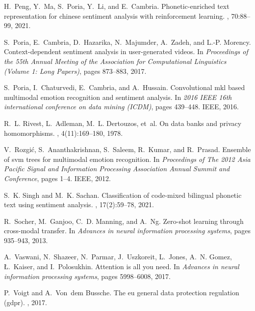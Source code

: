 \documentclass[11pt]{article}
\begin{document}
\begin{thebibliography}{10}
H.~Peng, Y.~Ma, S.~Poria, Y.~Li, and E.~Cambria.
\newblock Phonetic-enriched text representation for chinese sentiment analysis
  with reinforcement learning.
, 70:88--99, 2021.

S.~Poria, E.~Cambria, D.~Hazarika, N.~Majumder, A.~Zadeh, and L.-P. Morency.
\newblock Context-dependent sentiment analysis in user-generated videos.
\newblock In {\em Proceedings of the 55th Annual Meeting of the Association for
  Computational Linguistics (Volume 1: Long Papers)}, pages 873--883, 2017.

S.~Poria, I.~Chaturvedi, E.~Cambria, and A.~Hussain.
\newblock Convolutional mkl based multimodal emotion recognition and sentiment
  analysis.
\newblock In {\em 2016 IEEE 16th international conference on data mining
  (ICDM)}, pages 439--448. IEEE, 2016.

R.~L. Rivest, L.~Adleman, M.~L. Dertouzos, et~al.
\newblock On data banks and privacy homomorphisms.
, 4(11):169--180, 1978.

V.~Rozgi{\'c}, S.~Ananthakrishnan, S.~Saleem, R.~Kumar, and R.~Prasad.
\newblock Ensemble of svm trees for multimodal emotion recognition.
\newblock In {\em Proceedings of The 2012 Asia Pacific Signal and Information
  Processing Association Annual Summit and Conference}, pages 1--4. IEEE, 2012.

S.~K. Singh and M.~K. Sachan.
\newblock Classification of code-mixed bilingual phonetic text using sentiment
  analysis.
, 17(2):59--78, 2021.

R.~Socher, M.~Ganjoo, C.~D. Manning, and A.~Ng.
\newblock Zero-shot learning through cross-modal transfer.
\newblock In {\em Advances in neural information processing systems}, pages
  935--943, 2013.

A.~Vaswani, N.~Shazeer, N.~Parmar, J.~Uszkoreit, L.~Jones, A.~N. Gomez,
  {\L}.~Kaiser, and I.~Polosukhin.
\newblock Attention is all you need.
\newblock In {\em Advances in neural information processing systems}, pages
  5998--6008, 2017.

P.~Voigt and A.~Von~dem Bussche.
\newblock The eu general data protection regulation (gdpr).
, 2017.


\end{thebibliography}
\end{document}
